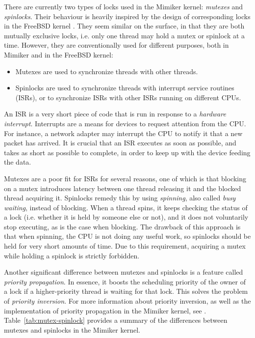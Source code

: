 \documentclass[shortabstract, manyadvisors, english, mgr]{iithesis}
\begin{document}
There are currently two types of locks used in the Mimiker kernel:
\textit{mutexes} and \textit{spinlocks}. Their behaviour is heavily inspired by
the design of corresponding locks in the FreeBSD kernel \cite{freebsd-locking}.
They seem similar on the surface, in that they are both mutually exclusive
locks, i.e. only one thread may hold a mutex or spinlock at a time. However,
they are conventionally used for different purposes, both in Mimiker and in the
FreeBSD kernel:
\begin{itemize}
\item Mutexes are used to synchronize threads with other threads.
\item Spinlocks are used to synchronize threads with interrupt service routines
  (ISRs), or to synchronize ISRs with other ISRs running on different CPUs.
\end{itemize}
An ISR is a very short piece of code that is run in response to a
\textit{hardware interrupt}. Interrupts are a means for devices to request
attention from the CPU. For instance, a network adapter may interrupt the CPU to
notify it that a new packet has arrived. It is crucial that an ISR executes as
soon as possible, and takes as short as possible to complete, in order to keep
up with the device feeding the data.

Mutexes are a poor fit for ISRs for several reasons, one of which is that
blocking on a mutex introduces latency between one thread releasing it and the
blocked thread acquiring it. Spinlocks remedy this by using \textit{spinning},
also called \textit{busy waiting}, instead of blocking. When a thread spins, it
keeps checking the status of a lock (i.e. whether it is held by someone else or
not), and it does not voluntarily stop executing, as is the case when blocking.
The drawback of this approach is that when spinning, the CPU is not doing any
useful work, so spinlocks should be held for very short amounts of time. Due to
this requirement, acquiring a mutex while holding a spinlock is strictly forbidden.

Another significant difference between mutexes and spinlocks is a feature called
\textit{priority propagation}. In essence, it boosts the scheduling priority of
the owner of a lock if a higher-priority thread is waiting for that lock. This
solves the problem of \textit{priority inversion}. For more information about
priority inversion, as well as the implementation of priority propagation in the
Mimiker kernel, see \cite{julian-thesis}. Table~\ref{tab:mutex-spinlock}
provides a summary of the differences between mutexes and spinlocks in the
Mimiker kernel.
\end{document}
